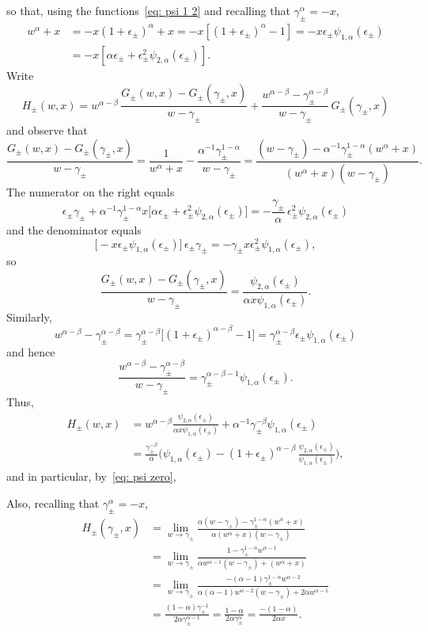\documentclass[12pt,a4paper]{article}
\begin{document}
so that, using the functions~\eqref{eq: psi 1 2} and recalling that 
$\gamma_\pm^\alpha=-x$,
\begin{align*}
w^\alpha+x&=-x(1+\epsilon_\pm)^\alpha+x=-x[(1+\epsilon_\pm)^\alpha-1]
    =-x\epsilon_\pm\psi_{1,\alpha}(\epsilon_\pm)\\
    &=-x[\alpha\epsilon_\pm+\epsilon_\pm^2\psi_{2,\alpha}(\epsilon_\pm)].
\end{align*}
Write
\[
H_\pm(w,x)=w^{\alpha-\beta}\,\frac{G_\pm(w,x)-G_\pm(\gamma_\pm,x)}{w-\gamma_\pm}
    +\frac{w^{\alpha-\beta}-\gamma_\pm^{\alpha-\beta}}{w-\gamma_\pm}\,
    G_\pm(\gamma_\pm,x)
\]
and observe that
\[
\frac{G_\pm(w,x)-G_\pm(\gamma_\pm,x)}{w-\gamma_\pm}=\frac{1}{w^\alpha+x}
    -\frac{\alpha^{-1}\gamma_\pm^{1-\alpha}}{w-\gamma_\pm}
    =\frac{(w-\gamma_\pm)-\alpha^{-1}\gamma_\pm^{1-\alpha}(w^\alpha+x)}%
{(w^\alpha+x)(w-\gamma_\pm)}.
\]
The numerator on the right equals
\[
\epsilon_\pm\gamma_\pm+\alpha^{-1}\gamma_\pm^{1-\alpha}x
    \bigl[\alpha\epsilon_\pm+\epsilon_\pm^2\psi_{2,\alpha}(\epsilon_\pm)\bigr]
    =-\frac{\gamma_\pm}{\alpha}\,\epsilon_\pm^2\psi_{2,\alpha}(\epsilon_\pm)
\]
and the denominator equals
\[
\bigl[-x\epsilon_\pm\psi_{1,\alpha}(\epsilon_\pm)\bigr]\,\epsilon_\pm\gamma_\pm
    =-\gamma_\pm x\epsilon_\pm^2\psi_{1,\alpha}(\epsilon_\pm),
\]
so
\[
\frac{G_\pm(w,x)-G_\pm(\gamma_\pm,x)}{w-\gamma_\pm}
=\frac{\psi_{2,\alpha}(\epsilon_\pm)}{\alpha x\psi_{1,\alpha}(\epsilon_\pm)}.
\]
Similarly,
\[
w^{\alpha-\beta}-\gamma_\pm^{\alpha-\beta}
    =\gamma_\pm^{\alpha-\beta}\bigl[(1+\epsilon_\pm)^{\alpha-\beta}-1]
    =\gamma_\pm^{\alpha-\beta}\epsilon_\pm\psi_{1,\alpha}(\epsilon_\pm)
\]
and hence
\[
\frac{w^{\alpha-\beta}-\gamma_\pm^{\alpha-\beta}}{w-\gamma_\pm}
    =\gamma_\pm^{\alpha-\beta-1}\psi_{1,\alpha}(\epsilon_\pm).
\]
Thus,
\begin{align*}
H_\pm(w,x)&=w^{\alpha-\beta}
\frac{\psi_{2,\alpha}(\epsilon_\pm)}{\alpha x\psi_{1,\alpha}(\epsilon_\pm)}
    +\alpha^{-1}\gamma_\pm^{-\beta}\psi_{1,\alpha}(\epsilon_\pm)\\
    &=\frac{\gamma_\pm^{-\beta}}{\alpha}\biggl(\psi_{1,\alpha}(\epsilon_\pm)
    -(1+\epsilon_\pm)^{\alpha-\beta}\,
    \frac{\psi_{2,\alpha}(\epsilon_\pm)}{\psi_{1,\alpha}(\epsilon_\pm)}\biggr),
\end{align*}
and in particular, by~\eqref{eq: psi zero},






Also, recalling that $\gamma_\pm^\alpha=-x$,
\begin{align*}
H_\pm(\gamma_\pm,x)&=\lim_{w\to\gamma_\pm}
\frac{\alpha(w-\gamma_\pm)-\gamma_\pm^{1-\alpha}(w^\alpha+x)}%
{\alpha(w^\alpha+x)(w-\gamma_\pm)}\\
    &=\lim_{w\to\gamma_\pm}\frac{1-\gamma_\pm^{1-\alpha}w^{\alpha-1}}%
{\alpha w^{\alpha-1}(w-\gamma_\pm)+(w^\alpha+x)}\\
&=\lim_{w\to\gamma_\pm}\frac{-(\alpha-1)\gamma_\pm^{1-\alpha}w^{\alpha-2}}%
{\alpha(\alpha-1)w^{\alpha-2}(w-\gamma_\pm)+2\alpha w^{\alpha-1}}\\
&=\frac{(1-\alpha)\gamma_\pm^{-1}}{2\alpha\gamma_\pm^{\alpha-1}}
=\frac{1-\alpha}{2\alpha\gamma_\pm^\alpha}=\frac{-(1-\alpha)}{2\alpha x}.
\end{align*}
\end{document}
